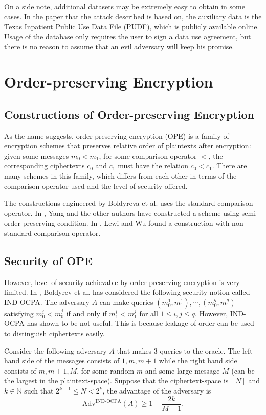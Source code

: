 On a side note, additional datasets may be extremely easy to obtain in some cases. In the paper that the attack described is based on, the auxiliary data is the Texas Inpatient Public Use Data File (PUDF), which is publicly available online. Usage of the database only requires the user to sign a data use agreement, but there is no reason to assume that an evil adversary will keep his promise.




\section{Order-preserving Encryption}
\subsection{Constructions of Order-preserving Encryption}
As the name suggests, order-preserving encryption (OPE) is a family of encryption schemes that preserves relative order of plaintexts after encryption: given some messages $m_0 < m_1$, for some comparison operator $<$, the corresponding ciphertexts $c_0$ and $c_1$ must have the relation $c_0 < c_1$. There are many schemes in this family, which differs from each other in terms of the comparison operator used and the level of security offered.

The constructions engineered by Boldyreva et al. \cite{Boldyreva:2009:OSE:1533674.1533691, Boldyreva:2011:OER:2033036.2033080} uses the standard comparison operator. In \cite{Yang2017266}, Yang and the other authors have constructed a scheme using semi-order preserving condition. In \cite{Lewi:2016:OEN:2976749.2978376}, Lewi and Wu found a construction with non-standard comparison operator.


\subsection{Security of OPE}
However, level of security achievable by order-preserving encryption is very limited. In \cite{Boldyreva:2009:OSE:1533674.1533691}, Boldyrev et al. has considered the following security notion called IND-OCPA. The adversary $A$ can make queries $(m_0^1, m_1^1), \cdots, (m_0^q, m_1^q)$ satisfying $m_0^i < m_0^j$ if and only if $m_1^i < m_1^j$ for all $1 \leq i,j \leq q$. However, IND-OCPA has shown to be not useful. This is because leakage of order can be used to distinguish ciphertexts easily.

Consider the following adversary $A$ that makes 3 queries to the oracle. The left hand side of the messages consists of $1, m, m+1$ while the right hand side consists of $m, m+1, M$, for some random $m$ and some large message $M$ (can be the largest in the plaintext-space). Suppose that the ciphertext-space is $[N]$ and $k \in \mathbb{N}$ such that $2^{k-1} \leq N < 2^k$, the advantage of the adversary is
\begin{equation}
	\text{Adv}^{\text{IND-OCPA}}(A) \geq 1 - \frac{2k}{M-1}.
\end{equation}

